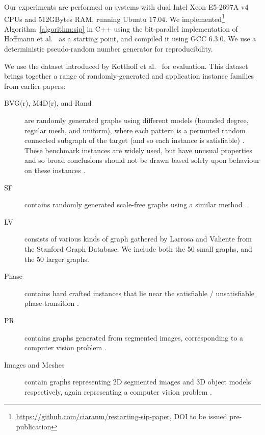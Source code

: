 \documentclass[a4paper,UKenglish]{lipics-v2018}
\newcommand{\algorithmref}[1]{Algorithm~\ref{#1}}
\begin{document}
Our experiments are performed on systems with dual Intel Xeon E5-2697A v4 CPUs and 512GBytes RAM,
running Ubuntu 17.04. We
implemented\footnote{\url{https://github.com/ciaranm/restarting-sip-paper}, DOI to be issued pre-publication}
\algorithmref{algorithm:sip} in C++ using the bit-parallel implementation of
Hoffmann et al.\ \cite{DBLP:conf/aaai/HoffmannMR17} as a starting point, and compiled it using GCC 6.3.0. We use a
deterministic pseudo-random number generator for reproducibility.

We use the dataset introduced by Kotthoff et al.\ \cite{DBLP:conf/lion/KotthoffMS16} for evaluation. This dataset
brings together a range of randomly-generated and application instance families from earlier papers:

\begin{description}
    \item[BVG(r), M4D(r), and Rand] are randomly generated graphs using different models (bounded
        degree, regular mesh, and uniform), where each pattern is a permuted random connected subgraph
        of the target (and so each instance is satisfiable) \cite{DBLP:journals/pami/CordellaFSV04}.
        These benchmark instances are widely used, but have unusual properties and so broad
        conclusions should not be drawn based solely upon behaviour on these instances
        \cite{DBLP:journals/jair/McCreeshPST18}.
    \item[SF] contains randomly generated scale-free graphs using a similar method
        \cite{DBLP:journals/constraints/ZampelliDS10}.
   \item[LV] consists of various kinds of graph gathered by Larrosa and Valiente
       \cite{DBLP:journals/mscs/LarrosaV02} from the Stanford Graph Database. We include both the
        50 small graphs, and the 50 larger graphs.
    \item[Phase] contains hard crafted instances that lie near the satisfiable / unsatisfiable phase
        transition \cite{DBLP:journals/jair/McCreeshPST18}.
    \item[PR] contains graphs generated from segmented images, corresponding to a computer vision
        problem \cite{DBLP:journals/pr/SolnonDHJ15}.
    \item[Images and Meshes] contain graphs representing 2D segmented images and 3D object models
        respectively, again representing a computer vision problem
        \cite{DBLP:journals/cviu/DamiandSHJS11}.
\end{description}
\end{document}
